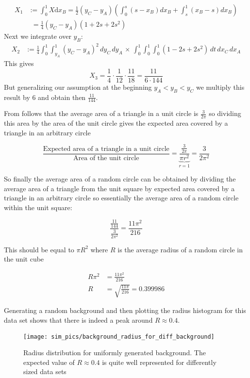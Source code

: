 \documentclass[11pt,twoside]{scrreprt}
\begin{document}
\begin{align}
  X_1 &:= \int_0^1X\text{d}x_B=\frac{1}{2}(y_C-y_A)\left( \int_0^s(s-x_B)dx_B + \int_s^1(x_B-s)dx_B\right)\nonumber\\
      &\phantom{:}= \frac{1}{4}(y_C-y_A)(1+2s+2s^2)\nonumber
\end{align}
Next we integrate over $y_B$:
\begin{align}
  X_2 &:= \frac{1}{4}\int_0^1\int_{y_A}^1(y_C-y_A)^2\,dy_C\,dy_A\,\times\,\int_0^1\int_0^1\int_0^1(1-2s+2s^2)\,dt\,dx_C\,dx_A  \nonumber
\end{align}
This gives
\[
  X_3 = \frac{1}{4}\cdot \frac{1}{12} \cdot \frac{11}{18} = \frac{11}{6\cdot144}
\]
But generalizing our assumption at the beginning $y_A < y_B < y_C$ we multiply this result by $6$ and obtain then $\frac{11}{144}$.

From \cite{Weisstein2016} follows that the average area of a triangle in a unit circle is $\frac{3}{2\pi}$ so dividing this area by the
area of the unit circle gives the expected area covered by a triangle in an arbitrary circle

\[
\frac{\text{Expected area of a triangle in a unit circle}}{\text{Area of the unit circle}} = \underbrace{\frac{\frac{3}{2\pi}}{\pi r^2}}_{r=1} = \frac{3}{2\pi^2}
\]

So finally the average area of a random circle can be obtained by dividing the average area of a triangle from the unit square by expected
area covered by a triangle in an arbitrary circle so essentially the average area of a random circle within the unit square:

\[
  \frac{\frac{11}{144}}{\frac{3}{2\pi^2}} = \frac{11\pi^2}{216}
\]

This should be equal to $\pi R^2$ where $R$ is the average radius of a random circle in the unit cube

\begin{align}
  R\pi^2 &= \frac{11\pi^2}{216}\nonumber\\
  R &= \sqrt{\frac{11\pi}{216}} = 0.399986\nonumber
\end{align}

Generating a random background and then plotting the radius histogram for this data set shows that there is indeed a peak around
 $R\approx 0.4$.

 \begin{figure}[tb]
   \centering
   \texttt{[image: sim\_pics/background\_radius\_for\_diff\_background]}
   \caption[Radius distribution for background]{Radius distribution for uniformly generated 
    background. The expected value of $R\approx 0.4$
   is quite well represented for differently sized data sets}
   \label{fig:rad_dist}
 \end{figure}
\end{document}
